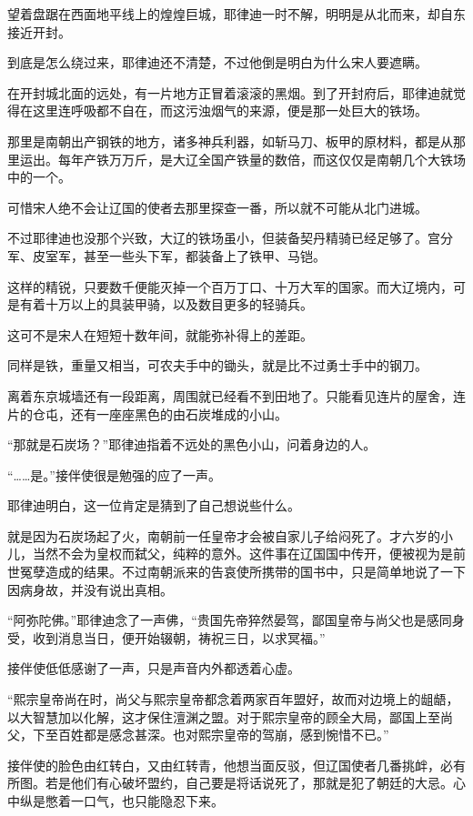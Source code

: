 望着盘踞在西面地平线上的煌煌巨城，耶律迪一时不解，明明是从北而来，却自东接近开封。

到底是怎么绕过来，耶律迪还不清楚，不过他倒是明白为什么宋人要遮瞒。

在开封城北面的远处，有一片地方正冒着滚滚的黑烟。到了开封府后，耶律迪就觉得在这里连呼吸都不自在，而这污浊烟气的来源，便是那一处巨大的铁场。

那里是南朝出产钢铁的地方，诸多神兵利器，如斩马刀、板甲的原材料，都是从那里运出。每年产铁万万斤，是大辽全国产铁量的数倍，而这仅仅是南朝几个大铁场中的一个。

可惜宋人绝不会让辽国的使者去那里探查一番，所以就不可能从北门进城。

不过耶律迪也没那个兴致，大辽的铁场虽小，但装备契丹精骑已经足够了。宫分军、皮室军，甚至一些头下军，都装备上了铁甲、马铠。

这样的精锐，只要数千便能灭掉一个百万丁口、十万大军的国家。而大辽境内，可是有着十万以上的具装甲骑，以及数目更多的轻骑兵。

这可不是宋人在短短十数年间，就能弥补得上的差距。

同样是铁，重量又相当，可农夫手中的锄头，就是比不过勇士手中的钢刀。

离着东京城墙还有一段距离，周围就已经看不到田地了。只能看见连片的屋舍，连片的仓屯，还有一座座黑色的由石炭堆成的小山。

“那就是石炭场？”耶律迪指着不远处的黑色小山，问着身边的人。

“……是。”接伴使很是勉强的应了一声。

耶律迪明白，这一位肯定是猜到了自己想说些什么。

就是因为石炭场起了火，南朝前一任皇帝才会被自家儿子给闷死了。才六岁的小儿，当然不会为皇权而弑父，纯粹的意外。这件事在辽国国中传开，便被视为是前世冤孽造成的结果。不过南朝派来的告哀使所携带的国书中，只是简单地说了一下因病身故，并没有说出真相。

“阿弥陀佛。”耶律迪念了一声佛，“贵国先帝猝然晏驾，鄙国皇帝与尚父也是感同身受，收到消息当日，便开始辍朝，祷祝三日，以求冥福。”

接伴使低低感谢了一声，只是声音内外都透着心虚。

“熙宗皇帝尚在时，尚父与熙宗皇帝都念着两家百年盟好，故而对边境上的龃龉，以大智慧加以化解，这才保住澶渊之盟。对于熙宗皇帝的顾全大局，鄙国上至尚父，下至百姓都是感念甚深。也对熙宗皇帝的驾崩，感到惋惜不已。”

接伴使的脸色由红转白，又由红转青，他想当面反驳，但辽国使者几番挑衅，必有所图。若是他们有心破坏盟约，自己要是将话说死了，那就是犯了朝廷的大忌。心中纵是憋着一口气，也只能隐忍下来。


